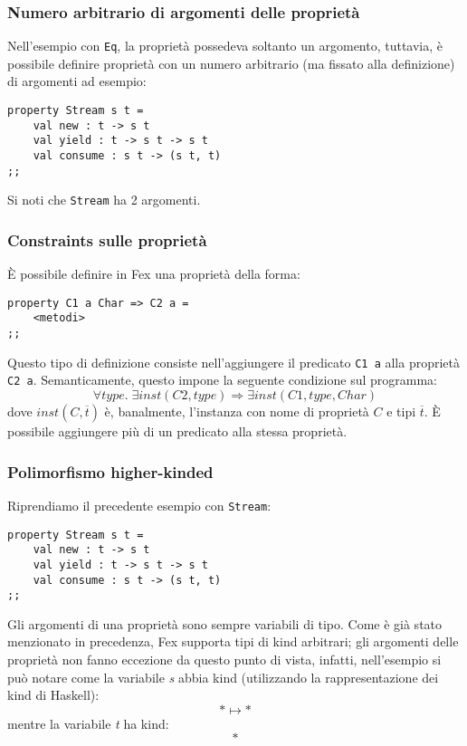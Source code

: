\documentclass[10pt,a4paper]{article}
\begin{document}
\subsubsection{Numero arbitrario di argomenti delle proprietà}
Nell'esempio con \texttt{Eq}, la proprietà possedeva soltanto un argomento, tuttavia, è possibile definire proprietà
con un numero arbitrario (ma fissato alla definizione) di argomenti ad esempio:
\begin{lstlisting}
property Stream s t =
    val new : t -> s t
    val yield : t -> s t -> s t
    val consume : s t -> (s t, t)
;;
\end{lstlisting}
Si noti che \texttt{Stream} ha 2 argomenti.

\subsubsection{Constraints sulle proprietà}
\`E possibile definire in Fex una proprietà della forma:
\begin{lstlisting}
property C1 a Char => C2 a =
    <metodi>
;;
\end{lstlisting}
Questo tipo di definizione consiste nell'aggiungere il predicato \texttt{C1 a} alla proprietà \texttt{C2 a}.
Semanticamente, questo impone la seguente condizione sul programma:
    \[ \forall type . \; \exists inst(C2, type) \Longrightarrow \exists inst(C1, type, Char) \]
dove $ inst(C, \overline{t}) $ è, banalmente, l'instanza con nome di proprietà $ C $ e tipi $ \overline{t} $. \`E
possibile aggiungere più di un predicato alla stessa proprietà.

\subsubsection{Polimorfismo higher-kinded}
Riprendiamo il precedente esempio con \texttt{Stream}:
\begin{lstlisting}
property Stream s t =
    val new : t -> s t
    val yield : t -> s t -> s t
    val consume : s t -> (s t, t)
;;
\end{lstlisting}
Gli argomenti di una proprietà sono sempre variabili di tipo. Come è già stato menzionato in precedenza, Fex supporta
tipi di kind arbitrari; gli argomenti delle proprietà non fanno eccezione da questo punto di vista, infatti, nell'esempio
si può notare come la variabile \textit{s} abbia kind (utilizzando la rappresentazione dei kind di Haskell):
    \[ * \mapsto * \]
mentre la variabile \textit{t} ha kind:
   \[ * \]
\end{document}

